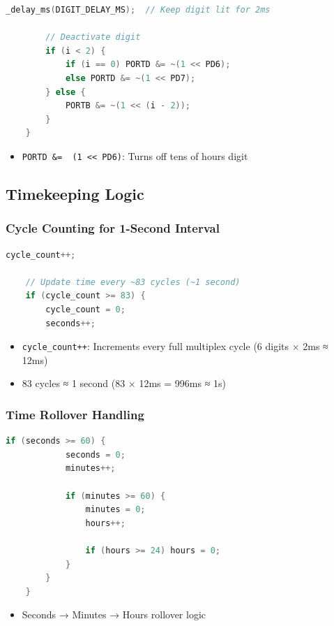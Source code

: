 \documentclass{article}
\begin{document}
\begin{lstlisting}[language=C]
        _delay_ms(DIGIT_DELAY_MS);  // Keep digit lit for 2ms
        
        // Deactivate digit
        if (i < 2) {
            if (i == 0) PORTD &= ~(1 << PD6);
            else PORTD &= ~(1 << PD7);
        } else {
            PORTB &= ~(1 << (i - 2));
        }
    }
\end{lstlisting}

\begin{itemize}
\item \texttt{PORTD \&= ~(1 << PD6)}: Turns off tens of hours digit
\end{itemize}

\subsection{Timekeeping Logic}
\subsubsection{Cycle Counting for 1-Second Interval}
\begin{lstlisting}[language=C]
    cycle_count++;
    
    // Update time every ~83 cycles (~1 second)
    if (cycle_count >= 83) {
        cycle_count = 0;
        seconds++;
\end{lstlisting}

\begin{itemize}
\item \texttt{cycle\_count++}: Increments every full multiplex cycle (6 digits × 2ms ≈ 12ms)
\item 83 cycles ≈ 1 second (83 × 12ms = 996ms ≈ 1s)
\end{itemize}

\subsubsection{Time Rollover Handling}
\begin{lstlisting}[language=C]
        if (seconds >= 60) {
            seconds = 0;
            minutes++;
            
            if (minutes >= 60) {
                minutes = 0;
                hours++;
                
                if (hours >= 24) hours = 0;
            }
        }
    }
\end{lstlisting}

\begin{itemize}
\item Seconds → Minutes → Hours rollover logic
\end{itemize}
\end{document}
